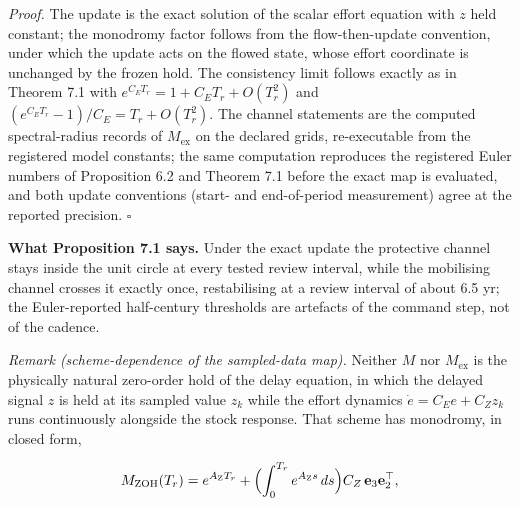 \documentclass[11pt]{article}
\begin{document}
\emph{Proof.} The update is the exact solution of the scalar effort
equation with \(z\) held constant; the monodromy factor follows from the
flow-then-update convention, under which the update acts on the flowed
state, whose effort coordinate is unchanged by the frozen hold. The
consistency limit follows exactly as in Theorem 7.1 with
\(e^{C_E T_r} = 1 + C_E T_r + O(T_r^2)\) and
\((e^{C_E T_r} - 1)/C_E = T_r + O(T_r^2)\). The channel statements are
the computed spectral-radius records of \(M_{\mathrm{ex}}\) on the
declared grids, re-executable from the registered model constants; the
same computation reproduces the registered Euler numbers of Proposition
6.2 and Theorem 7.1 before the exact map is evaluated, and both update
conventions (start- and end-of-period measurement) agree at the reported
precision. \ensuremath{\square}

\textbf{What Proposition 7.1 says.} Under the exact update the
protective channel stays inside the unit circle at every tested review
interval, while the mobilising channel crosses it exactly once,
restabilising at a review interval of about 6.5 yr; the Euler-reported
half-century thresholds are artefacts of the command step, not of the
cadence.

\emph{Remark (scheme-dependence of the sampled-data map).} Neither \(M\)
nor \(M_{\mathrm{ex}}\) is the physically natural zero-order hold of the
delay equation, in which the delayed signal \(z\) is held at its sampled
value \(z_k\) while the effort dynamics \(\dot e = C_E e + C_Z z_k\)
runs continuously alongside the stock response. That scheme has
monodromy, in closed form,

\[M_{\mathrm{ZOH}}(T_r) = e^{A_{\mathrm{Z}} T_r} + \Bigl( \int_0^{T_r} e^{A_{\mathrm{Z}} s}\, ds \Bigr) C_Z\, \mathbf e_3 \mathbf e_2^\top,\]
\end{document}
